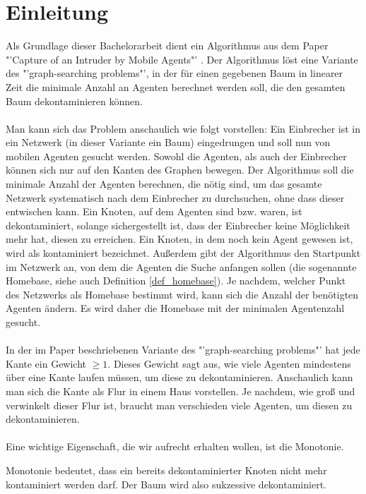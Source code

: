 \section{Einleitung}

Als Grundlage dieser Bachelorarbeit dient ein Algorithmus aus dem Paper "'Capture of an Intruder by Mobile Agents"' \cite{cima_paper}. Der Algorithmus löst eine Variante des "'graph-searching problems"', in der für einen gegebenen Baum in linearer Zeit die minimale Anzahl an Agenten berechnet werden soll, die den gesamten Baum dekontaminieren können.
\\
\\
Man kann sich das Problem anschaulich wie folgt vorstellen: Ein Einbrecher ist in ein Netzwerk (in dieser Variante ein Baum) eingedrungen und soll nun von mobilen Agenten gesucht werden. Sowohl die Agenten, als auch der Einbrecher können sich nur auf den Kanten des Graphen bewegen. Der Algorithmus soll die minimale Anzahl der Agenten berechnen, die nötig sind, um das gesamte Netzwerk systematisch nach dem Einbrecher zu durchsuchen, ohne dass dieser entwischen kann. Ein Knoten, auf dem Agenten sind bzw. waren, ist dekontaminiert, solange sichergestellt ist, dass der Einbrecher keine Möglichkeit mehr hat, diesen zu erreichen. Ein Knoten, in dem noch kein Agent gewesen ist, wird als kontaminiert bezeichnet. Außerdem gibt der Algorithmus den Startpunkt im Netzwerk an, von dem die Agenten die Suche anfangen sollen (die sogenannte Homebase, siehe auch Definition \ref{def_homebase}). Je nachdem, welcher Punkt des Netzwerks als Homebase bestimmt wird, kann sich die Anzahl der benötigten Agenten ändern. Es wird daher die Homebase mit der minimalen Agentenzahl gesucht.
\\
\\
In der im Paper beschriebenen Variante des "'graph-searching problems"' hat jede Kante ein Gewicht $\geq 1$. Dieses Gewicht sagt aus, wie viele Agenten mindestens über eine Kante laufen müssen, um diese zu dekontaminieren. Anschaulich kann man sich die Kante als Flur in einem Haus vorstellen. Je nachdem, wie groß und verwinkelt dieser Flur ist, braucht man verschieden viele Agenten, um diesen  zu dekontaminieren.
\\
\\
Eine wichtige Eigenschaft, die wir aufrecht erhalten wollen, ist die Monotonie. 
\begin{mydef}\label{def_monotonie}
	Monotonie bedeutet, dass ein bereits dekontaminierter Knoten nicht mehr kontaminiert werden darf. Der Baum wird also sukzessive dekontaminiert. 
\end{mydef}
